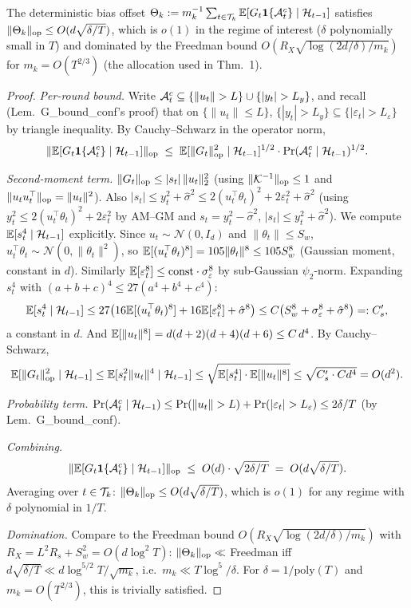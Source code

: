 \begin{proposition}
\label{prop:theta_bound}
The deterministic bias offset
$\Theta_k := m_k^{-1}\sum_{t\in\mathcal{T}_k}\mathbb{E}[G_t\mathbf 1\{\mathcal{A}_t^c\}\mid\mathcal{H}_{t-1}]$
satisfies $\|\Theta_k\|_{\mathrm{op}} \le O(d\sqrt{\delta/T})$, which is $o(1)$
in the regime of interest ($\delta$ polynomially small in $T$) and
dominated by the Freedman bound $O(R_X\sqrt{\log(2d/\delta)/m_k})$
for $m_k = O(T^{2/3})$ (the allocation used in Thm.~1).
\end{proposition}
\begin{proof}
\emph{Per-round bound.} Write $\cA_t^c \subseteq \{\|u_t\|>L\}\cup\{|y_t|>L_y\}$,
and recall (Lem.\ G\_bound\_conf's proof) that on $\{\|u_t\|\le L\}$,
$\{|y_t|>L_y\}\subseteq\{|\varepsilon_t|>L_\varepsilon\}$ by triangle
inequality. By Cauchy--Schwarz in the operator norm,
\[
  \|\mathbb{E}[G_t\mathbf 1\{\mathcal{A}_t^c\}\mid\mathcal{H}_{t-1}]\|_{\mathrm{op}}
  \;\le\; \mathbb{E}[\|G_t\|_{\mathrm{op}}^2\mid\mathcal{H}_{t-1}]^{1/2}\cdot\Pr(\mathcal{A}_t^c\mid\mathcal{H}_{t-1})^{1/2}.
\]

\emph{Second-moment term.} $\|G_t\|_{\mathrm{op}}\le|s_t|\,\|u_t\|_2^2$ (using
$\|\mathcal K^{-1}\|_{\mathrm{op}}\le 1$ and $\|u_tu_t^\top\|_{\mathrm{op}}=\|u_t\|^2$).
Also
$|s_t|\le y_t^2+\hat\sigma^2\le 2(u_t^\top\theta_t)^2+2\varepsilon_t^2+\hat\sigma^2$
(using $y_t^2\le 2(u_t^\top\theta_t)^2+2\varepsilon_t^2$ by AM--GM and
$s_t=y_t^2-\hat\sigma^2$, $|s_t|\le y_t^2+\hat\sigma^2$).
We compute $\mathbb{E}[s_t^4\mid\mathcal{H}_{t-1}]$ explicitly. Since
$u_t\sim\mathcal N(0,I_d)$ and $\|\theta_t\|\le S_w$,
$u_t^\top\theta_t\sim\mathcal N(0,\|\theta_t\|^2)$, so
$\mathbb{E}[(u_t^\top\theta_t)^8]=105\|\theta_t\|^8\le 105 S_w^8$ (Gaussian
moment, constant in $d$). Similarly
$\mathbb{E}[\varepsilon_t^8]\le\text{const}\cdot\sigma_\varepsilon^8$ by
sub-Gaussian $\psi_2$-norm. Expanding $s_t^4$ with
$(a+b+c)^4\le 27(a^4+b^4+c^4)$:
\[
\mathbb{E}[s_t^4\mid\mathcal{H}_{t-1}]\le 27\bigl(16\mathbb{E}[(u_t^\top\theta_t)^8]+16\mathbb{E}[\varepsilon_t^8]+\hat\sigma^8\bigr)
\le C\bigl(S_w^8+\sigma_\varepsilon^8+\hat\sigma^8\bigr)=:C_s^\prime,
\]
a constant in $d$. And $\mathbb{E}[\|u_t\|^8]=d(d+2)(d+4)(d+6)\le C\,d^4$. By
Cauchy--Schwarz,
\[
\mathbb{E}[\|G_t\|_{\mathrm{op}}^2\mid\mathcal{H}_{t-1}]\le\mathbb{E}[s_t^2\|u_t\|^4\mid\mathcal{H}_{t-1}]
\le\sqrt{\mathbb{E}[s_t^4]\cdot\mathbb{E}[\|u_t\|^8]}\le\sqrt{C_s^\prime\cdot C d^4}=O(d^2).
\]

\emph{Probability term.}
$\Pr(\cA_t^c\mid\cH_{t-1})\le\Pr(\|u_t\|>L)+\Pr(|\varepsilon_t|>L_\varepsilon)\le 2\delta/T$
(by Lem.\ G\_bound\_conf).

\emph{Combining.}
\[
  \|\mathbb{E}[G_t\mathbf 1\{\mathcal{A}_t^c\}\mid\mathcal{H}_{t-1}]\|_{\mathrm{op}}
  \;\le\; O(d)\cdot\sqrt{2\delta/T}
  \;=\; O(d\sqrt{\delta/T}).
\]
Averaging over $t\in\mathcal{T}_k$: $\|\Theta_k\|_{\mathrm{op}}\le O(d\sqrt{\delta/T})$,
which is $o(1)$ for any regime with $\delta$ polynomial in $1/T$.

\emph{Domination.} Compare to the Freedman bound
$O(R_X\sqrt{\log(2d/\delta)/m_k})$ with $R_X=L^2 R_s+S_w^2=O(d\log^2 T)$:
$\|\Theta_k\|_{\mathrm{op}}\ll$ Freedman iff $d\sqrt{\delta/T}\ll d\log^{5/2}T/\sqrt{m_k}$,
i.e.\ $m_k\ll T\log^5/\delta$. For $\delta=1/\mathrm{poly}(T)$ and
$m_k=O(T^{2/3})$, this is trivially satisfied.
\end{proof}


